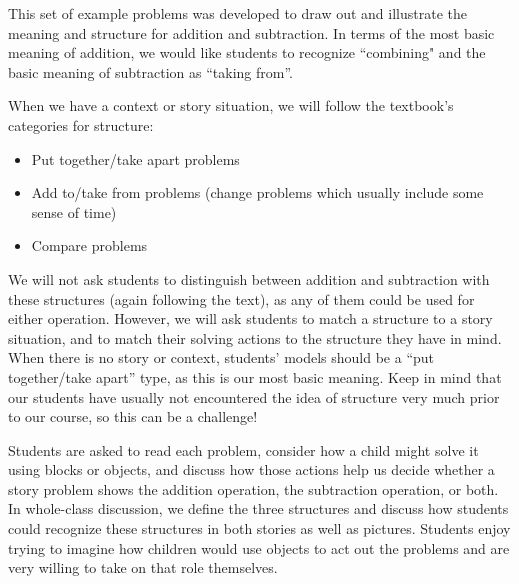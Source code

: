 \documentclass{ximera}
\begin{document}
\newpage
\begin{instructorNotes}
This set of example problems was developed to draw out and illustrate the meaning and structure for addition and subtraction. In terms of the most basic meaning of addition, we would like students to recognize ``combining" and the basic meaning of subtraction as ``taking from''. 

When we have a context or story situation, we will follow the textbook's categories for structure:
\begin{itemize}
\item Put together/take apart problems
\item Add to/take from problems (change problems which usually include some sense of time)
\item Compare problems
\end{itemize}
We will not ask students to distinguish between addition and subtraction with these structures (again following the text), as any of them could be used for either operation.  However, we will ask students to match a structure to a story situation, and to match their solving actions to the structure they have in mind. When there is no story or context, students' models should be a ``put together/take apart'' type, as this is our most basic meaning. Keep in mind that our students have usually not encountered the idea of structure very much prior to our course, so this can be a challenge!

Students are asked to read each problem, consider how a child might solve it using blocks or objects, and discuss how those actions help us decide whether a story problem shows the addition operation, the subtraction operation, or both.  In whole-class discussion, we define the three structures and discuss how students could recognize these structures in both stories as well as pictures. Students enjoy trying to imagine how children would use objects to act out the problems and are very willing to take on that role themselves.



\end{instructorNotes}
\end{document}
